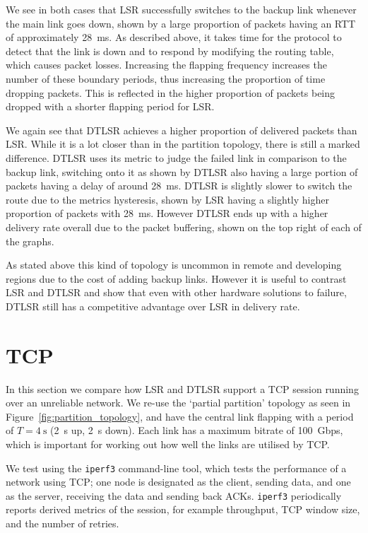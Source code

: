 \documentclass[withindex,glossary,openany]{cam-thesis}
\begin{document}
We see in both cases that LSR successfully switches to the backup link whenever the main link goes down, shown by a large proportion of packets having an RTT of approximately \SI{28}{\ms}. As described above, it takes time for the protocol to detect that the link is down and to respond by modifying the routing table, which causes packet losses. Increasing the flapping frequency increases the number of these boundary periods, thus increasing the proportion of time dropping packets. This is reflected in the higher proportion of packets being dropped with a shorter flapping period for LSR.

We again see that DTLSR achieves a higher proportion of delivered packets than LSR. While it is a lot closer than in the partition topology, there is still a marked difference. DTLSR uses its metric to judge the failed link in comparison to the backup link, switching onto it as shown by DTLSR also having a large portion of packets having a delay of around \SI{28}{\ms}. DTLSR is slightly slower to switch the route due to the metrics hysteresis, shown by LSR having a slightly higher proportion of packets with \SI{28}{\ms}. However DTLSR ends up with a higher delivery rate overall due to the packet buffering, shown on the top right of each of the graphs.

As stated above this kind of topology is uncommon in remote and developing regions due to the cost of adding backup links. However it is useful to contrast LSR and DTLSR and show that even with other hardware solutions to failure, DTLSR still has a competitive advantage over LSR in delivery rate.

\section{TCP}

In this section we compare how LSR and DTLSR support a TCP session running over an unreliable network. We re-use the `partial partition' topology as seen in Figure~\ref{fig:partition_topology}, and have the central link flapping with a period of $T=\SI{4}{\s}$ (\SI{2}{\s} up, \SI{2}{\s} down). Each link has a maximum bitrate of \SI{100}{Gbps}, which is important for working out how well the links are utilised by TCP.

We test using the \texttt{iperf3} command-line tool, which tests the performance of a network using TCP; one node is designated as the client, sending data, and one as the server, receiving the data and sending back ACKs. \texttt{iperf3} periodically reports derived metrics of the session, for example throughput, TCP window size, and the number of retries.
\end{document}

